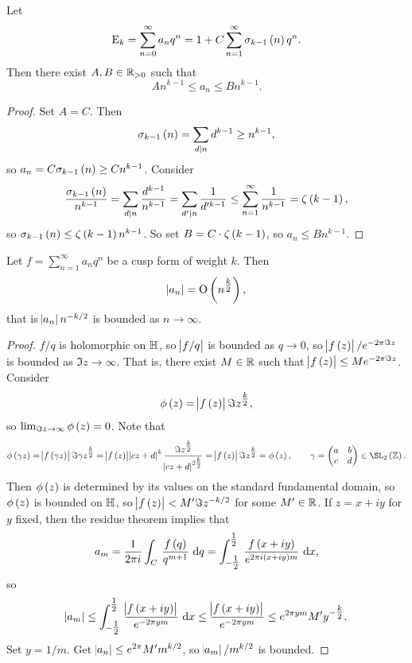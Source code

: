 \begin{proposition}
Let
$$ \E_k = \sum_{n = 0}^\infty a_nq^n = 1 + C\sum_{n = 1}^\infty \sigma_{k - 1}\br{n}q^n. $$
Then there exist $ A, B \in \mathbb{R}_{> 0} $ such that
$$ An^{k - 1} \le a_n \le Bn^{k - 1}. $$
\end{proposition}

\begin{proof}
Set $ A = C $. Then
$$ \sigma_{k - 1}\br{n} = \sum_{d \mid n} d^{k - 1} \ge n^{k - 1}, $$
so $ a_n = C\sigma_{k - 1}\br{n} \ge Cn^{k - 1} $. Consider
$$ \dfrac{\sigma_{k - 1}\br{n}}{n^{k - 1}} = \sum_{d \mid n} \dfrac{d^{k - 1}}{n^{k - 1}} = \sum_{d' \mid n} \dfrac{1}{d'^{k - 1}} \le \sum_{n = 1}^\infty \dfrac{1}{n^{k - 1}} = \zeta\br{k - 1}, $$
so $ \sigma_{k - 1}\br{n} \le \zeta\br{k - 1}n^{k - 1} $. So set $ B = C \cdot \zeta\br{k - 1} $, so $ a_n \le Bn^{k - 1} $.
\end{proof}

\begin{theorem}[Hasse]
Let $ f = \sum_{n = 1}^\infty a_nq^n $ be a cusp form of weight $ k $. Then
$$ \abs{a_n} = \O\br{n^{\tfrac{k}{2}}}, $$
that is $ \abs{a_n}n^{-k / 2} $ is bounded as $ n \to \infty $.
\end{theorem}

\pagebreak

\begin{proof}
$ f / q $ is holomorphic on $ \mathbb{H} $, so $ \abs{f / q} $ is bounded as $ q \to 0 $, so $ \abs{f\br{z}} / e^{-2\pi \Im z} $ is bounded as $ \Im z \to \infty $. That is, there exist $ M \in \mathbb{R} $ such that $ \abs{f\br{z}} \le Me^{-2\pi \Im z} $. Consider
$$ \phi\br{z} = \abs{f\br{z}}\Im z^{\tfrac{k}{2}}, $$
so $ \lim_{\Im z \to \infty} \phi\br{z} = 0 $. Note that
$$ \phi\br{\gamma z} = \abs{f\br{\gamma z}}\Im \gamma z^{\tfrac{k}{2}} = \abs{f\br{z}}\abs{cz + d}^k\dfrac{\Im z^{\tfrac{k}{2}}}{\abs{cz + d}^{2\tfrac{k}{2}}} = \abs{f\br{z}}\Im z^{\tfrac{k}{2}} = \phi\br{z}, \qquad \gamma = \twobytwo{a}{b}{c}{d} \in \SL_2\br{\ZZ}. $$
Then $ \phi\br{z} $ is determined by its values on the standard fundamental domain, so $ \phi\br{z} $ is bounded on $ \mathbb{H} $, so $ \abs{f\br{z}} < M'\Im z^{-k / 2} $ for some $ M' \in \mathbb{R} $. If $ z = x + iy $ for $ y $ fixed, then the residue theorem implies that
$$ a_m = \dfrac{1}{2\pi i}\intd{C}{}{\dfrac{f\br{q}}{q^{m + 1}}}{q} = \intd{-\tfrac{1}{2}}{\tfrac{1}{2}}{\dfrac{f\br{x + iy}}{e^{2\pi i\br{x + iy}m}}}{x}, $$
so
$$ \abs{a_m} \le \intd{-\tfrac{1}{2}}{\tfrac{1}{2}}{\dfrac{\abs{f\br{x + iy}}}{e^{-2\pi ym}}}{x} \le \dfrac{\abs{f\br{x + iy}}}{e^{-2\pi ym}} \le e^{2\pi ym}M'y^{-\tfrac{k}{2}}. $$
Set $ y = 1 / m $. Get $ \abs{a_n} \le e^{2\pi}M'm^{k / 2} $, so $ \abs{a_m} / m^{k / 2} $ is bounded.
\end{proof}


